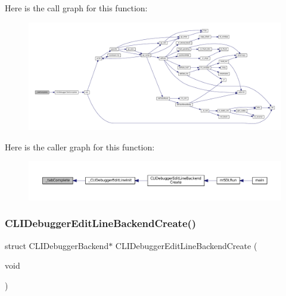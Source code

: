 Here is the call graph for this function\+:
\nopagebreak
\begin{figure}[H]
\begin{center}
\leavevmode
\includegraphics[width=350pt]{cli-el-backend_8c_ac8fc3ad07748126ae6a19a218f312411_cgraph}
\end{center}
\end{figure}
Here is the caller graph for this function\+:
\nopagebreak
\begin{figure}[H]
\begin{center}
\leavevmode
\includegraphics[width=350pt]{cli-el-backend_8c_ac8fc3ad07748126ae6a19a218f312411_icgraph}
\end{center}
\end{figure}
\mbox{\label{cli-el-backend_8c_aea9ca36da1b56d3b608e61aba06b9044}} 
\subsubsection{\texorpdfstring{C\+L\+I\+Debugger\+Edit\+Line\+Backend\+Create()}{CLIDebuggerEditLineBackendCreate()}}
{\footnotesize\ttfamily struct C\+L\+I\+Debugger\+Backend$\ast$ C\+L\+I\+Debugger\+Edit\+Line\+Backend\+Create (\begin{DoxyParamCaption}\item[{void}]{ }\end{DoxyParamCaption})}

